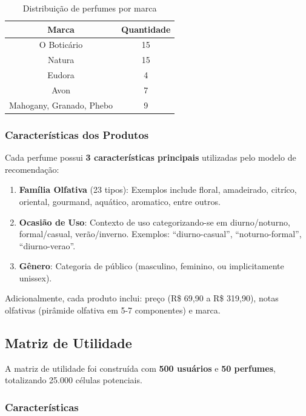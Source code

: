 \documentclass[12pt,a4paper]{article}
\begin{document}
\begin{table}[H]
\centering
\begin{tabular}{|c|c|}
\toprule
\textbf{Marca} & \textbf{Quantidade} \\
\midrule
O Boticário & 15 \\
Natura & 15 \\
Eudora & 4 \\
Avon & 7 \\
Mahogany, Granado, Phebo & 9 \\
\bottomrule
\end{tabular}
\caption{Distribuição de perfumes por marca}
\label{tab:marcas}
\end{table}

\subsubsection{Características dos Produtos}

Cada perfume possui \textbf{3 características principais} utilizadas pelo modelo de recomendação:

\begin{enumerate}
    \item \textbf{Família Olfativa} (23 tipos): Exemplos include floral, amadeirado, citríco, oriental, gourmand, aquático, aromatico, entre outros.
    
    \item \textbf{Ocasião de Uso}: Contexto de uso categorizando-se em diurno/noturno, formal/casual, verão/inverno. Exemplos: ``diurno-casual'', ``noturno-formal'', ``diurno-verao''.
    
    \item \textbf{Gênero}: Categoria de público (masculino, feminino, ou implicitamente unissex).
\end{enumerate}

Adicionalmente, cada produto inclui: preço (R\$ 69,90 a R\$ 319,90), notas olfativas (pirâmide olfativa em 5-7 componentes) e marca.

\subsection{Matriz de Utilidade}

A matriz de utilidade foi construída com \textbf{500 usuários} e \textbf{50 perfumes}, totalizando 25.000 células potenciais.

\subsubsection{Características}
\end{document}
